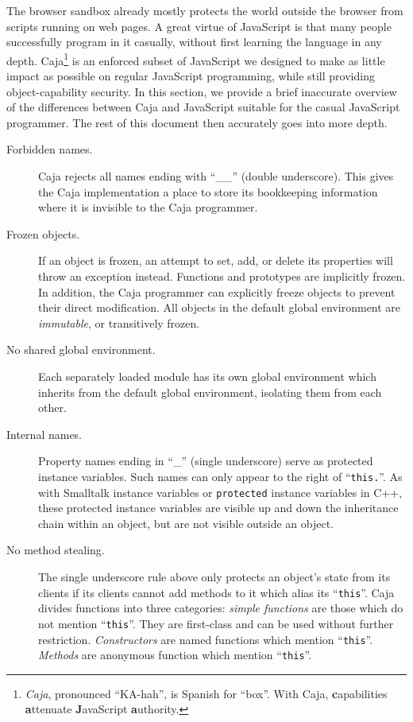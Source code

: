 \documentclass[letterpaper,twocolumn,10pt]{article}
\newcommand{\code}[1]{{\tt {#1}}}              %
\begin{document}
The browser sandbox already mostly protects the world outside the browser 
from scripts running on web pages. A great virtue of JavaScript is that many 
people successfully program in it casually, without first learning the 
language in any depth. Caja\footnote{
%
\emph{Caja}, pronounced ``KA-hah'', is Spanish for ``box''. With Caja, 
\textbf{c}apabilities \textbf{a}ttenuate \textbf{J}avaScript 
\textbf{a}uthority.
%
} is an enforced subset of JavaScript we designed to make as little impact as 
possible on regular JavaScript programming, while still providing 
object-capability security. In this section, we provide a brief inaccurate 
overview of the differences between Caja and JavaScript suitable for the 
casual JavaScript programmer. The rest of this document then accurately goes 
into more depth.

\begin{description}

  \item[Forbidden names.] Caja rejects all names ending with ``\_\_'' (double 
  underscore). This gives the Caja implementation a place to store its 
  bookkeeping information where it is invisible to the Caja programmer.
 
  \item[Frozen objects.] If an object is frozen, an attempt to set, add, or 
  delete its properties will throw an exception instead. Functions and 
  prototypes are implicitly frozen. In addition, the Caja programmer can 
  explicitly freeze objects to prevent their direct modification. All objects 
  in the default global environment are \emph{immutable}, or transitively 
  frozen.
 
  \item[No shared global environment.] Each separately loaded module has its 
  own global environment which inherits from the default global environment, 
  isolating them from each other.

  \item[Internal names.] Property names ending in ``\_'' (single underscore) 
  serve as protected instance variables. Such names can only appear to the 
  right of ``\code{this.}''. As with Smalltalk instance variables or 
  \code{protected} instance variables in C++, these protected instance 
  variables are visible up and down the inheritance chain within an object, 
  but are not visible outside an object.
 
  \item[No method stealing.] The single underscore rule above only protects 
  an object's state from its clients if its clients cannot add methods to it 
  which alias its ``\code{this}''. Caja divides functions into three 
  categories: \emph{simple functions} are those which do not mention 
  ``\code{this}''. They are first-class and can be used without further 
  restriction. \emph{Constructors} are named functions which mention 
  ``\code{this}''. \emph{Methods} are anonymous function which mention 
  ``\code{this}''.


\end{description}
\end{document}
